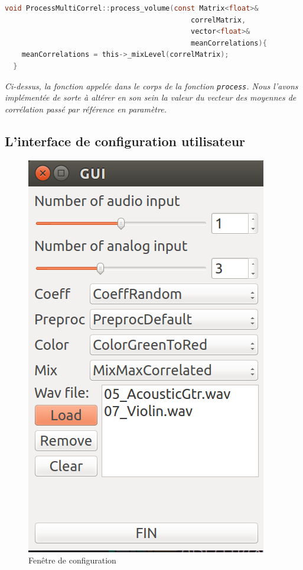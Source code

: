  \begin{lstlisting}[language=C, frame=single, breaklines=true]
  void ProcessMultiCorrel::process_volume(const Matrix<float>&
                                            correlMatrix,
                                            vector<float>&
                                            meanCorrelations){
    meanCorrelations = this->_mixLevel(correlMatrix);
  }
 \end{lstlisting}
 \begin{center}
  \textit{Ci-dessus, la fonction appelée dans le corps de la fonction \verb!process!. Nous l'avons implémentée de sorte à altérer en son sein la valeur du vecteur des moyennes de corrélation passé par référence en paramètre.}
 \end{center}

 \subsection{L'interface de configuration utilisateur}

 \begin{figure}[H]
  \centering
  \includegraphics[scale=0.5]{assets/settingsWindow.png}
  \caption{Fenêtre de configuration}
  \label{schéma global}
 \end{figure}

